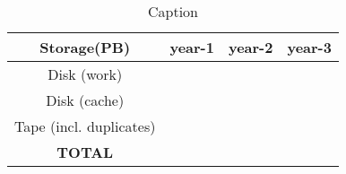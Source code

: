 \documentclass{article}
\begin{document}
\begin{table}[htb!]
    \centering
    \begin{tabular}{c|c|c|c}
        \hline
        Storage(PB) & year-1 & year-2 & year-3 \\
        \hline
        \hline
        Disk (work)    & & & \\
        \hline
        Disk (cache)    & & & \\
        \hline
        Tape (incl. duplicates)    & & & \\
        \hline
        \textbf{TOTAL} & & & \\
        \hline
    \end{tabular}
    \caption{Caption}
    \label{tab:storage_summary}
\end{table}




\end{document}
